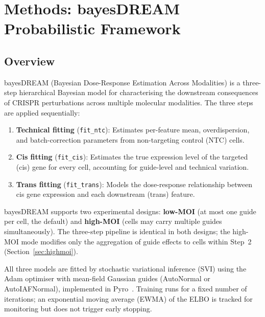 \documentclass[12pt]{article}
\begin{document}
\section{Methods: bayesDREAM Probabilistic Framework}

\tableofcontents

\listoffigures

\subsection{Overview}

bayesDREAM (Bayesian Dose-Response Estimation Across Modalities) is a three-step hierarchical
Bayesian model for characterising the downstream consequences of CRISPR perturbations across
multiple molecular modalities.
%
The three steps are applied sequentially:
\begin{enumerate}
  \item \textbf{Technical fitting} (\texttt{fit\_ntc}): Estimates per-feature mean, overdispersion, and
        batch-correction parameters from non-targeting control (NTC) cells.
  \item \textbf{Cis fitting} (\texttt{fit\_cis}): Estimates the true expression level of the
        targeted (cis) gene for every cell, accounting for guide-level and technical variation.
  \item \textbf{Trans fitting} (\texttt{fit\_trans}): Models the dose-response relationship
        between cis gene expression and each downstream (trans) feature.
\end{enumerate}

bayesDREAM supports two experimental designs: \textbf{low-MOI} (at most one guide per cell,
the default) and \textbf{high-MOI} (cells may carry multiple guides simultaneously).
The three-step pipeline is identical in both designs; the high-MOI mode modifies only
the aggregation of guide effects to cells within Step~2
(Section~\ref{sec:highmoi}).

All three models are fitted by stochastic variational inference (SVI) using the Adam optimiser
with mean-field Gaussian guides (AutoNormal or AutoIAFNormal), implemented in Pyro~\cite{bingham2019pyro}.
%
Training runs for a fixed number of iterations; an exponential moving average (EWMA) of the ELBO is tracked for monitoring but does not trigger early stopping.
\end{document}
